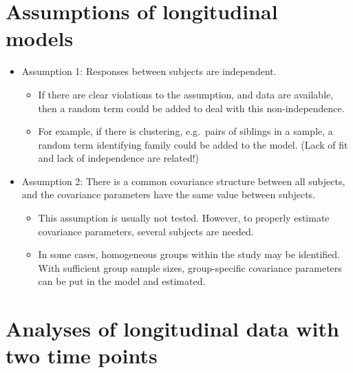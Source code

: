 \documentclass[
  9pt,
  ignorenonframetext,
]{beamer}
\providecommand{\tightlist}{%
  \setlength{\itemsep}{0pt}\setlength{\parskip}{0pt}}
\begin{document}
\hypertarget{assumptions-of-longitudinal-models}{%
\section{Assumptions of longitudinal
models}\label{assumptions-of-longitudinal-models}}

\begin{frame}{}
\protect\hypertarget{section-8}{}
\begin{itemize}
\item
  Assumption 1: Responses between subjects are independent.

  \begin{itemize}
  \tightlist
  \item
    If there are clear violations to the assumption, and data are
    available, then a random term could be added to deal with this
    non-independence.
  \item
    For example, if there is clustering, e.g.~pairs of siblings in a
    sample, a random term identifying family could be added to the
    model. (Lack of fit and lack of independence are related!)
  \end{itemize}
\item
  Assumption 2: There is a common covariance structure between all
  subjects, and the covariance parameters have the same value between
  subjects.

  \begin{itemize}
  \tightlist
  \item
    This assumption is usually not tested. However, to properly estimate
    covariance parameters, several subjects are needed.
  \item
    In some cases, homogeneous groups within the study may be
    identified. With sufficient group sample sizes, group-specific
    covariance parameters can be put in the model and estimated.
  \end{itemize}
\end{itemize}
\end{frame}

\hypertarget{analyses-of-longitudinal-data-with-two-time-points}{%
\section{Analyses of longitudinal data with two time
points}\label{analyses-of-longitudinal-data-with-two-time-points}}
\end{document}
